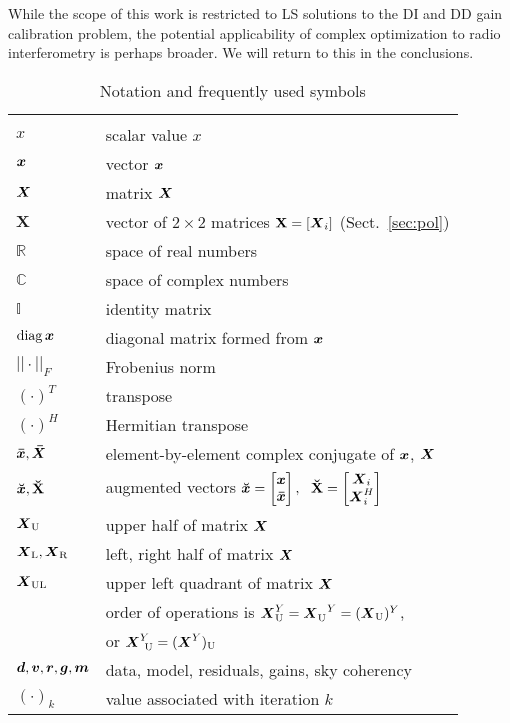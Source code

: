 \documentclass[useAMS,usenatbib]{mn2e}
\makeatletter
\newcommand{\COMPLEX}{\mathbb{C}}
\newcommand{\REAL}{\mathbb{R}}
\newcommand{\II}{\mathbb{I}}
\newcommand{\Matrix}[2]{\left [ \begin{array}{@{}#1@{}}#2\end{array} \right ]}
\newcommand{\AUGx}[1]{\mathbf{\breve{#1}}}
\newcommand{\AUG}[1]{\bmath{\breve{#1}}}
\newcommand{\TOP}{\mathrm{U}}%
\newcommand{\LEFT}{\mathrm{L}}
\newcommand{\RIGHT}{\mathrm{R}}
\newcommand{\UL}{\mathrm{UL}}%
\makeatother
\begin{document}
While the scope of this work is restricted to LS solutions to the DI and DD gain calibration problem, the potential 
applicability of complex optimization to radio interferometry is perhaps broader. We will return to this in the conclusions.


\begin{table}
\caption{\label{tab:notation}Notation and frequently used symbols}
\begin{tabular}{ll}
\hline\\
$x$        & scalar value $x$    \\
$\bmath{x}$  & vector $\bmath{x}$  \\
$\bmath{X}$  & matrix $\bmath{X}$ \\
$\mathbf{X}$  & vector of $2\times2$ matrices $\mathbf{X}=[\bmath{X}_i]$ (Sect.~\ref{sec:pol})  \\
$\REAL$ & space of real numbers \\
$\COMPLEX$ & space of complex numbers \\
$\II$ & identity matrix \\
$\mathrm{diag}\,\bmath{x}$ & diagonal matrix formed from $\bmath{x}$\\
$||\cdot||_F$ & Frobenius norm \\
$(\cdot)^T$ & transpose \\
$(\cdot)^H$ & Hermitian transpose \\
$\bmath{\bar x},\bmath{\bar X}$ & element-by-element complex conjugate of $\bmath{x}$, $\bmath{X}$  \\
$\AUG{x}, \AUGx{X}$ & augmented vectors $\AUG{x} = \Matrix{c}{\bmath{x} \\ \bmath{\bar x}},~~\AUGx{X}=\Matrix{c}{\bmath{X}_i \\ \bmath{X}^H_i}$ \\
$\bmath{X}_\TOP$ & upper half of matrix $\bmath{X}$\\
$\bmath{X}_\LEFT, \bmath{X}_\RIGHT$ & left, right half of matrix $\bmath{X}$ \\
$\bmath{X}_\UL$ & upper left quadrant of matrix $\bmath{X}$\\
& order of operations is $\bmath{X}^Y_\TOP = \bmath{X}^{~~Y}_\TOP = (\bmath{X}_\TOP)^Y$, \\
& or $\bmath{X}^Y_{~\TOP} = (\bmath{X}^Y)_\TOP$ \\
$\bmath{d},\bmath{v},\bmath{r}, \bmath{g}, \bmath{m} $ & data, model, residuals, gains, sky coherency\\
$(\cdot)_k$ & value associated with iteration $k$ \\

\end{tabular}
\end{table}
\end{document}
